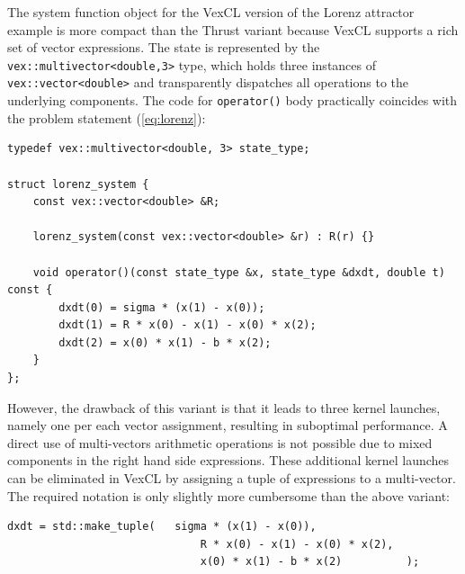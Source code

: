 \documentclass[final]{siamltex}
\newcommand{\code}[1]{\lstinline|#1|}
\newcommand{\eqref}[1]{(\ref{#1})}
\begin{document}
The system function object for the VexCL version of the Lorenz attractor example is
more compact than the Thrust variant because VexCL supports a rich set of
vector expressions. The state is represented by the
\code{vex::multivector<double,3>} type, which holds three instances of
\code{vex::vector<double>} and transparently dispatches all operations to the
underlying components. The code for \code{operator()} body practically
coincides with the problem statement \eqref{eq:lorenz}:
\begin{lstlisting}
typedef vex::multivector<double, 3> state_type;

struct lorenz_system {
    const vex::vector<double> &R;

    lorenz_system(const vex::vector<double> &r) : R(r) {}

    void operator()(const state_type &x, state_type &dxdt, double t) const {
        dxdt(0) = sigma * (x(1) - x(0));
        dxdt(1) = R * x(0) - x(1) - x(0) * x(2);
        dxdt(2) = x(0) * x(1) - b * x(2);
    }
};
\end{lstlisting}


However, the drawback of this variant is that it leads to three kernel launches, namely
one per each vector assignment, resulting in suboptimal performance. A direct
use of multi-vectors arithmetic operations is not possible due to mixed
components in the right hand side expressions.  These additional kernel
launches can be eliminated in VexCL by assigning a tuple of expressions to a
multi-vector.  The required notation is only slightly more cumbersome than the
above variant:
\begin{lstlisting}[firstnumber=9]
    dxdt = std::make_tuple(   sigma * (x(1) - x(0)),
                              R * x(0) - x(1) - x(0) * x(2),
                              x(0) * x(1) - b * x(2)          );
\end{lstlisting}
\end{document}
